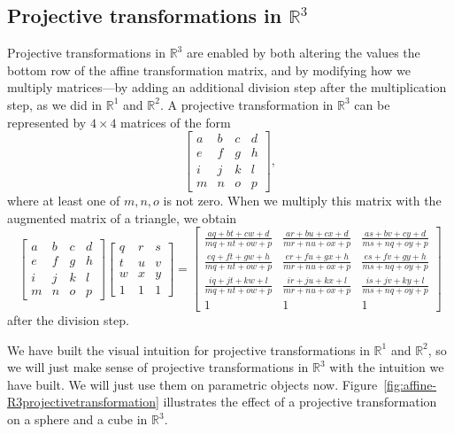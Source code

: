 \subsection{Projective transformations in \texorpdfstring{\(\mathbb{R}^{3}\)}{R3}}

Projective transformations in \(\mathbb{R}^{3}\) are enabled by both
altering the values the bottom row of the affine transformation matrix,
and by modifying how we multiply matrices---by adding an additional
division step after the multiplication step, as we did in \(\mathbb{R}^{1}\) and \(\mathbb{R}^{2}\).
A projective transformation in \(\mathbb{R}^{3}\) can be represented
by \(4\times4\) matrices of the form
\[
    \begin{bmatrix}
        a & b & c & d \\
        e & f & g & h \\
        i & j & k & l \\
        m & n & o & p
    \end{bmatrix},
\]
where at least one of \(m,n,o\) is not zero. When we multiply this matrix
with the augmented matrix of a triangle, we obtain
\[
    \begin{bmatrix}
        a & b & c & d \\
        e & f & g & h \\
        i & j & k & l \\
        m & n & o & p
    \end{bmatrix}
    \begin{bmatrix}
        q & r & s \\
        t & u & v \\
        w & x & y \\
        1 & 1 & 1
    \end{bmatrix}
    =
    \begin{bmatrix}
        \frac{aq+bt+cw+d}{mq+nt+ow+p} & \frac{ar+bu+cx+d}{mr+nu+ox+p} & \frac{as+bv+cy+d}{ms+nq+oy+p} \\
        \frac{eq+ft+gw+h}{mq+nt+ow+p} & \frac{er+fu+gx+h}{mr+nu+ox+p} & \frac{es+fv+gy+h}{ms+nq+oy+p} \\
        \frac{iq+jt+kw+l}{mq+nt+ow+p} & \frac{ir+ju+kx+l}{mr+nu+ox+p} & \frac{is+jv+ky+l}{ms+nq+oy+p} \\
        1 & 1 & 1
    \end{bmatrix}
\]
after the division step. 

We have built the visual intuition for projective transformations in 
\(\mathbb{R}^{1}\) and \(\mathbb{R}^{2}\), so we will just make sense 
of projective transformations in \(\mathbb{R}^{3}\) with the intuition 
we have built. We will just use them on parametric objects now.
Figure~\ref{fig:affine-R3projectivetransformation} illustrates the 
effect of a projective transformation on a sphere and a cube in \(\mathbb{R}^{3}\).

